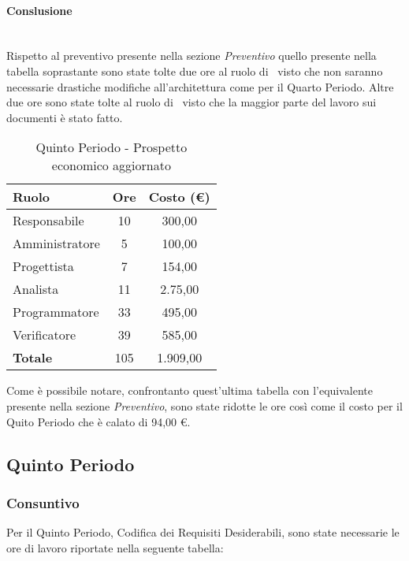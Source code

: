 \documentclass[../PianoDiProgetto_v3.0.0.tex]{subfiles}
\begin{document}
		\paragraph{Conslusione} \mbox{} \\
		Rispetto al preventivo presente nella sezione \textit{Preventivo} quello presente nella tabella soprastante sono state tolte due ore al ruolo di \progettista\, visto che non saranno necessarie drastiche modifiche all'architettura come per il Quarto Periodo. Altre due ore sono state tolte al ruolo di \analista\ visto che la maggior parte del lavoro sui documenti è stato fatto.
		
		\begin{table}[h]
			\centering
			\begin{tabular}{l * {2}{c}}
			\toprule
			\textbf{Ruolo} & \textbf{Ore} & \textbf{Costo (\euro{})} \\
			\midrule
			Responsabile & 10 & 300,00 \\
			Amministratore & 5 & 100,00 \\
			Progettista & 7 & 154,00 \\
			Analista & 11 & 2.75,00 \\		
			Programmatore & 33 & 495,00 \\		
			Verificatore & 39 & 585,00 \\				
			\midrule		
			\textbf{Totale} & 105 & 1.909,00 \\
			\bottomrule	
			\end{tabular}
			\caption{Quinto Periodo - Prospetto economico aggiornato}	
		\end{table}
		
		Come è possibile notare, confrontanto quest'ultima tabella con l'equivalente presente nella sezione \textit{Preventivo}, sono state ridotte le ore così come il costo per il Quito Periodo che è calato di 94,00 \euro{}.
		
	\subsection{Quinto Periodo}
		\subsubsection{Consuntivo}
		Per il Quinto Periodo, Codifica dei Requisiti Desiderabili, sono state necessarie le ore di lavoro riportate nella seguente tabella:
		
\end{document}
